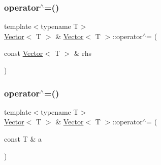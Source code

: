 \mbox{\label{classVector_acd4d558272832a19d614468400ca605d_acd4d558272832a19d614468400ca605d}} 
\subsubsection{\texorpdfstring{operator$^\wedge$=()}{operator^=()}\hspace{0.1cm}{\footnotesize\ttfamily [1/2]}}
{\footnotesize\ttfamily template$<$typename T$>$ \\
\mbox{\hyperlink{classVector}{Vector}}$<$ T $>$ \& \mbox{\hyperlink{classVector}{Vector}}$<$ T $>$\+::operator$^\wedge$= (\begin{DoxyParamCaption}\item[{const \mbox{\hyperlink{classVector}{Vector}}$<$ T $>$ \&}]{rhs }\end{DoxyParamCaption})\hspace{0.3cm}{\ttfamily [inline]}}

\mbox{\label{classVector_a6767000b5cbf4999aa301eb24a7b74fc_a6767000b5cbf4999aa301eb24a7b74fc}} 
\subsubsection{\texorpdfstring{operator$^\wedge$=()}{operator^=()}\hspace{0.1cm}{\footnotesize\ttfamily [2/2]}}
{\footnotesize\ttfamily template$<$typename T$>$ \\
\mbox{\hyperlink{classVector}{Vector}}$<$ T $>$ \& \mbox{\hyperlink{classVector}{Vector}}$<$ T $>$\+::operator$^\wedge$= (\begin{DoxyParamCaption}\item[{const T \&}]{a }\end{DoxyParamCaption})\hspace{0.3cm}{\ttfamily [inline]}}

\mbox{\label{classVector_ae751d4bf4c403e4578a9df1202e93f56_ae751d4bf4c403e4578a9df1202e93f56}} 
